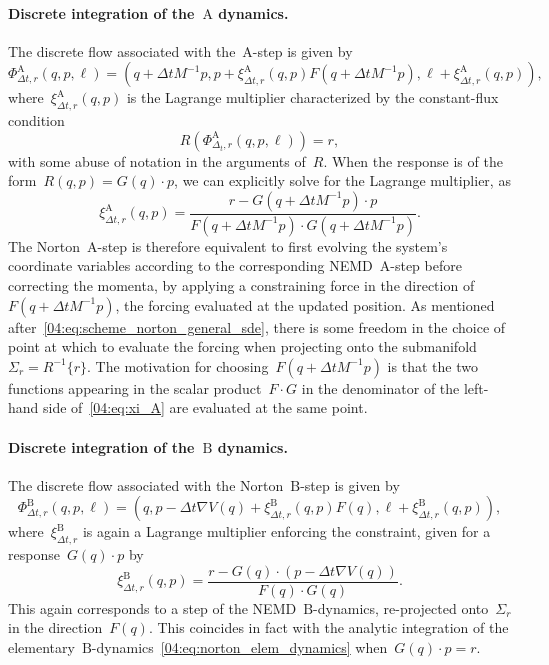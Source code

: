 \paragraph{Discrete integration of the~$\mathrm A$ dynamics.}
The discrete flow associated with the~$\mathrm{A}$-step is given by
\begin{equation}
    \label{04:eq:phi_A}
    {\Phi_{\Delta t,r}^{\mathrm{A}}\left(q,p,\ell\right) = \left(q +\Delta t M^{-1}p,p+\xi_{\Delta t,r}^{\mathrm{A}}(q,p) F\left(q +\Delta t M^{-1}p\right),\ell+\xi^{\mathrm{A}}_{\Delta t,r}(q,p)\right)},\end{equation}
where~$\xi_{\Delta t,r}^{\mathrm{A}}(q,p)$ is the Lagrange multiplier characterized by the constant-flux condition
\[R\left(\Phi_{\Delta_t,r}^{\mathrm{A}}(q,p,\ell)\right) = r,\]
with some abuse of notation in the arguments of~$R$.
When the response is of the form~$R(q,p)= G(q)\cdot p$, we can explicitly solve for the Lagrange multiplier, as
\begin{equation}
    \label{04:eq:xi_A}
    \xi_{\Delta t,r}^{\mathrm{A}}(q,p)= \frac{r-G\left(q +\Delta t M^{-1}p\right)\cdot p}{F\left(q +\Delta t M^{-1}p\right)\cdot G\left(q +\Delta t M^{-1}p\right)}.
\end{equation}
The Norton~$\mathrm{A}$-step is therefore equivalent to first evolving the system's coordinate variables according to the corresponding NEMD~$\mathrm{A}$-step before correcting the momenta, by applying a constraining force in the direction of~$F(q+\Delta t M^{-1}p)$, the forcing evaluated at the updated position. As mentioned after~\eqref{04:eq:scheme_norton_general_sde}, there is some freedom in the choice of point at which to evaluate the forcing when projecting onto the submanifold~$\Sigma_r = R^{-1}\{r\}$. The motivation for choosing~$F(q+\Delta t M^{-1}p)$ is that the two functions appearing in the scalar product~$F\cdot G$ in the denominator of the left-hand side of~\eqref{04:eq:xi_A} are evaluated at the same point. 

\paragraph{Discrete integration of the~$\mathrm B$ dynamics.}
The discrete flow associated with the Norton~$\mathrm{B}$-step is given by
\begin{equation}
    \label{04:eq:phi_B}
    \Phi_{\Delta t,r}^{\mathrm{B}}(q,p,\ell) = \left(q, p - \Delta t\nabla V(q) + \xi_{\Delta t,r}^{\mathrm{B}}(q,p)F(q), \ell + \xi_{\Delta t,r}^{\mathrm{B}}(q,p)\right),
\end{equation}
where~$\xi_{\Delta t,r}^{\mathrm{B}}$ is again a Lagrange multiplier enforcing the constraint, given for a response~$G(q)\cdot p$ by
\begin{equation}
    \label{04:eq:xi_B}
    \xi_{\Delta t,r}^{\mathrm{B}}(q,p)= \frac{r-G\left(q\right)\cdot \left(p -\Delta t \nabla V(q)\right)}{F\left(q\right)\cdot G\left(q\right)}.
\end{equation}
This again corresponds to a step of the NEMD~$\mathrm{B}$-dynamics, re-projected onto~$\Sigma_r$ in the direction~$F(q)$. This coincides in fact with the analytic integration of the elementary~$\mathrm{B}$-dynamics~\eqref{04:eq:norton_elem_dynamics} when~$G(q)\cdot p = r$.

